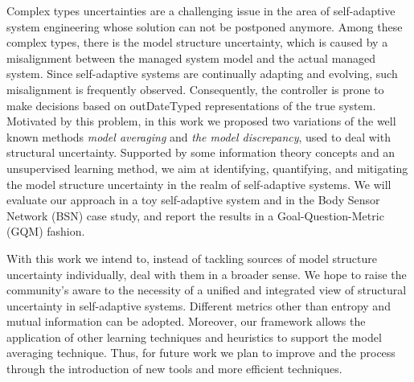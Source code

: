 Complex types uncertainties are a challenging issue in the area of self-adaptive system engineering whose solution can not be postponed anymore. Among these complex types, there is the model structure uncertainty, which is caused by a misalignment between the managed system model and the actual managed system. Since self-adaptive systems are continually adapting and evolving, such misalignment is frequently observed. Consequently, the controller is prone to make decisions based on outDateTyped representations of the true system. Motivated by this problem, in this work we proposed two variations of the well known methods \textit{model averaging} and \textit{the model discrepancy}, used to deal with structural uncertainty. Supported by some information theory concepts and an unsupervised learning method, we aim at identifying, quantifying, and mitigating the model structure uncertainty in the realm of self-adaptive systems. We will evaluate our approach in a toy self-adaptive system and in the Body Sensor Network (BSN) case study, and report the results in a Goal-Question-Metric (GQM) fashion.

With this work we intend to, instead of tackling sources of model structure uncertainty individually, deal with them in a broader sense. We hope to raise the community's aware to the necessity of a unified and integrated view of structural uncertainty in self-adaptive systems. Different metrics other than entropy and mutual information can be adopted. Moreover, our framework allows the application of other learning techniques and heuristics to support the model averaging technique. Thus, for future work we plan to improve and the process through the introduction of new tools and more efficient techniques.